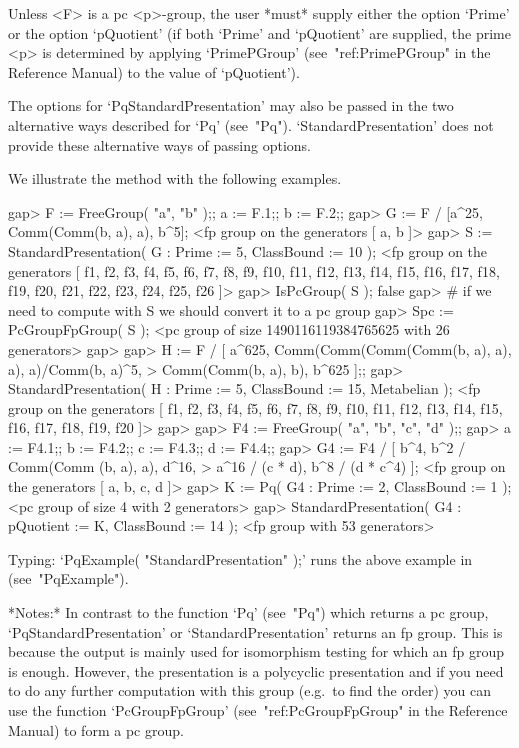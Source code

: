 \endlist

Unless <F> is a pc <p>-group, the user *must* supply  either  the  option
`Prime' or the option `pQuotient' (if both `Prime'  and  `pQuotient'  are
supplied,  the  prime  <p>  is  determined  by   applying   `PrimePGroup'
(see~"ref:PrimePGroup"  in  the  Reference  Manual)  to  the   value   of
`pQuotient').

The options for `PqStandardPresentation' may also be passed  in  the  two
alternative ways described for  `Pq'  (see~"Pq").  `StandardPresentation'
does not provide these alternative ways of passing options.

We illustrate the method with the following examples.

\beginexample
gap> F := FreeGroup( "a", "b" );; a := F.1;; b := F.2;;
gap> G := F / [a^25, Comm(Comm(b, a), a), b^5];
<fp group on the generators [ a, b ]>
gap> S := StandardPresentation( G : Prime := 5, ClassBound := 10 );
<fp group on the generators [ f1, f2, f3, f4, f5, f6, f7, f8, f9, f10, f11, 
  f12, f13, f14, f15, f16, f17, f18, f19, f20, f21, f22, f23, f24, f25, f26 ]>
gap> IsPcGroup( S );
false
gap> # if we need to compute with S we should convert it to a pc group
gap> Spc := PcGroupFpGroup( S );
<pc group of size 1490116119384765625 with 26 generators>
gap> 
gap> H := F / [ a^625, Comm(Comm(Comm(Comm(b, a), a), a), a)/Comm(b, a)^5,
>               Comm(Comm(b, a), b), b^625 ];;                     
gap> StandardPresentation( H : Prime := 5, ClassBound := 15, Metabelian );
<fp group on the generators [ f1, f2, f3, f4, f5, f6, f7, f8, f9, f10, f11, 
  f12, f13, f14, f15, f16, f17, f18, f19, f20 ]>
gap> 
gap> F4 := FreeGroup( "a", "b", "c", "d" );;                        
gap> a := F4.1;; b := F4.2;; c := F4.3;; d := F4.4;;
gap> G4 := F4 / [ b^4, b^2 / Comm(Comm (b, a), a), d^16,                
>                 a^16 / (c * d), b^8 / (d * c^4) ];
<fp group on the generators [ a, b, c, d ]>
gap> K := Pq( G4 : Prime := 2, ClassBound := 1 );
<pc group of size 4 with 2 generators>
gap> StandardPresentation( G4 : pQuotient := K, ClassBound := 14 );
<fp group with 53 generators>
\endexample

Typing: `PqExample( "StandardPresentation" );' runs the above example  in
{\GAP} (see~"PqExample").

*Notes:*
In contrast  to the  function `Pq' (see~"Pq")  which returns a  pc group,
`PqStandardPresentation' or `StandardPresentation' returns an  fp  group.
This is because the output is mainly used  for  isomorphism  testing  for
which an fp group is enough. However, the presentation  is  a  polycyclic
presentation and if you need to do  any  further  computation  with  this
group (e.g.~to find the order) you can use the function  `PcGroupFpGroup'
(see~"ref:PcGroupFpGroup" in the {\GAP} Reference Manual) to  form  a  pc
group.

